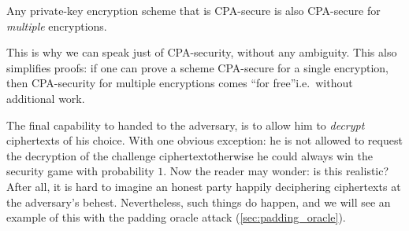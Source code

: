   \begin{theorem}
    \label{thm:cpa_single_mult}
    Any private-key encryption scheme that is CPA-secure is also CPA-secure for \emph{multiple} encryptions.
  \end{theorem}
  \noindent This is why we can speak just of CPA-security, without any ambiguity. This also simplifies proofs: if one can prove a scheme CPA-secure for a single encryption, then CPA-security for multiple encryptions comes ``for free''\emd i.e.\ without additional work.

  \bigskip

   The final capability to handed to the adversary, is to allow him to \emph{decrypt} ciphertexts of his choice. With one obvious exception: he is not allowed to request the decryption of the challenge ciphertext\emd otherwise he could always win the security game with probability $1$. Now the reader may wonder: is this realistic? After all, it is hard to imagine an honest party happily deciphering ciphertexts at the adversary's behest. Nevertheless, such things do happen, and we will see an example of this with the padding oracle attack (\ts\ref{sec:padding_oracle}).

  \medskip

